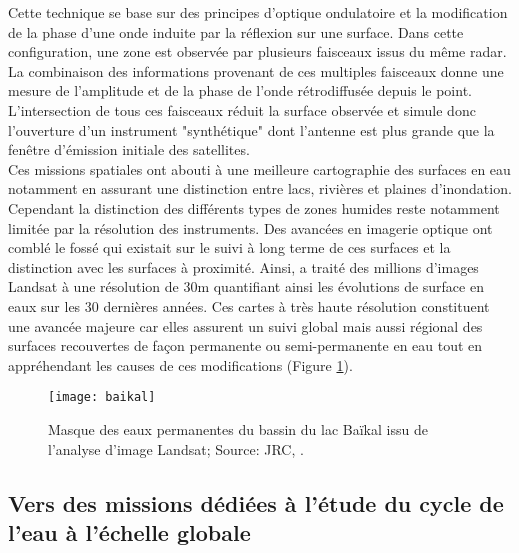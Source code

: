 \noindent Cette technique se base sur des principes d'optique ondulatoire et la modification de la phase d'une onde induite par la réflexion sur une surface. Dans cette configuration, une zone est observée par plusieurs faisceaux issus du même radar. La combinaison des informations provenant de ces multiples faisceaux donne une mesure de l'amplitude et de la phase de l'onde rétrodiffusée depuis le point. L'intersection de tous ces faisceaux réduit la surface observée et simule donc l'ouverture d'un instrument "synthétique" dont l'antenne est plus grande que la fenêtre d'émission initiale des satellites. \\

\noindent Ces missions spatiales ont abouti à une meilleure cartographie des surfaces en eau notamment en assurant une distinction entre lacs, rivières et plaines d'inondation. Cependant la distinction des différents types de zones humides reste notamment limitée par la résolution des instruments. Des avancées en imagerie optique ont comblé le fossé qui existait sur le suivi à long terme de ces surfaces et la distinction avec les surfaces à proximité. Ainsi, \citet{pekel2016} a traité des millions d'images Landsat à une résolution de 30m quantifiant ainsi les évolutions de surface en eaux sur les 30 dernières années. Ces cartes à très haute résolution constituent une avancée majeure car elles assurent un suivi global mais aussi régional des surfaces recouvertes de façon permanente ou semi-permanente en eau tout en appréhendant les causes de ces modifications (Figure \ref{baikal}).

\begin{figure}[h!]
 \centerline{\texttt{[image: baikal]}}
 \caption{Masque des eaux permanentes du bassin du lac Baïkal issu de l'analyse d'image Landsat; Source: JRC, \citet{pekel2016}.}
 \label{baikal}
\end{figure}


\subsection{{\selectfont Vers des missions dédiées à l'étude du cycle de l'eau à l'échelle globale}}

